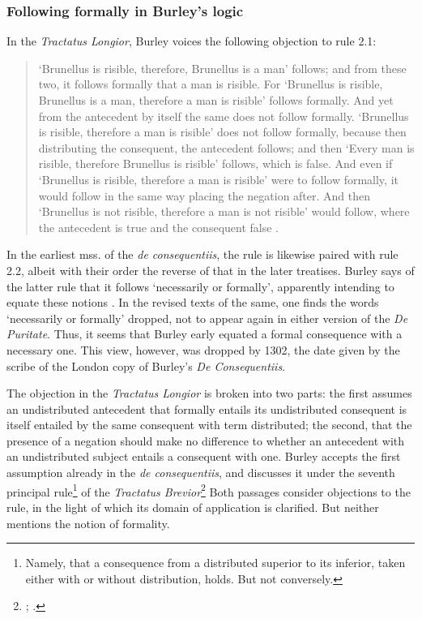 	\subsubsection{Following formally in Burley's logic}
	In the \textit{Tractatus Longior}, Burley voices the following objection to rule 2.1: 
	\begin{quote}
		`Brunellus is risible, therefore, Brunellus is a man' follows; and from these two, it follows formally that a man is risible. For `Brunellus is risible, Brunellus is a man, therefore a man is risible' follows formally. And yet from the antecedent by itself the same does not follow formally. `Brunellus is risible, therefore a man is risible' does not follow formally, because then distributing the consequent, the antecedent follows; and then `Every man is risible, therefore Brunellus is risible' follows, which is false. And even if `Brunellus is risible, therefore a man is risible' were to follow formally, it would follow in the same way placing the negation after. And then `Brunellus is not risible, therefore a man is not risible' would follow, where the antecedent is true and the consequent false \autocite[p. 80.13-29]{BurleyDPAL}.
	\end{quote}
	In the earliest mss. of the \textit{de consequentiis}, the rule is likewise paired with rule 2.2, albeit with their order the reverse of that in the later treatises. Burley says of the latter rule that it follows `necessarily or formally', apparently intending to equate these notions \autocite[p. 132, par. 84]{Green-Pedersen1980b}. In the revised texts of the same, one finds the words `necessarily or formally' dropped, not to appear again in either version of the \textit{De Puritate}. Thus, it seems that Burley early equated a formal consequence with a necessary one. This view, however, was dropped by 1302, the date given by the scribe of the London copy of Burley's \textit{De Consequentiis}.
	
	The objection in the \textit{Tractatus Longior} is broken into two parts: the first assumes an undistributed antecedent that formally entails its undistributed consequent is itself entailed by the same consequent with term distributed; the second, that the presence of a negation should make no difference to whether an antecedent with an undistributed subject entails a consequent with one. Burley accepts the first assumption already in the \textit{de consequentiis}, and discusses it under the seventh principal rule\footnote{Namely, that a consequence from a distributed superior to its inferior, taken either with or without distribution, holds. But not conversely.} of the \textit{Tractatus Brevior}\footnote{\cite[pp. 117-118, par. 26-31]{Green-Pedersen1980b}; \cite[pp. 211.21-212.28]{BurleyDPAL}.} Both passages consider objections to the rule, in the light of which its domain of application is clarified. But neither mentions the notion of formality.
	
